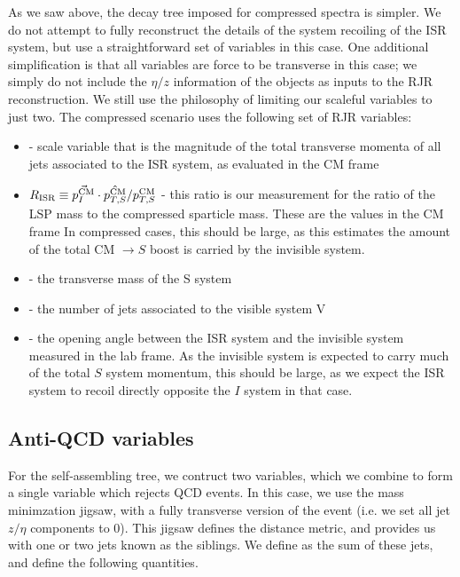 As we saw above, the decay tree imposed for compressed spectra is simpler.
We do not attempt to fully reconstruct the details of the system recoiling of the ISR system, but use a straightforward set of variables in this case.
One additional simplification is that all variables are force to be transverse in this case; we simply do not include the $\eta/z$ information of the objects as inputs to the RJR reconstruction.
We still use the philosophy of limiting our scaleful variables to just two.
The compressed scenario uses the following set of RJR variables:
\begin{itemize}
\item \ptisr - scale variable that is the magnitude of the total transverse momenta of all jets associated to the ISR system, as evaluated in the CM frame
\item $R_{\text{ISR}} \equiv \vec{p_I^{\text{CM}}} \cdot \hat{p_{T,S}^{\text{CM}}} / p_{T,S}^{\text{CM}} $  - this ratio is our measurement for the ratio of the LSP mass to the compressed sparticle mass.  These are the values in the CM frame  In compressed cases, this should be large, as this estimates the amount of the total CM $\rightarrow S$ boost is carried by the invisible system.
\item \MTS - the transverse mass of the S system
\item \NVjet - the number of jets associated to the visible system V
\item \dphiISR - the opening angle between the ISR system and the invisible system measured in the lab frame.  As the invisible system is expected to carry much of the total $S$ system momentum, this should be large, as we expect the ISR system to recoil directly opposite the $I$ system in that case.
\end{itemize}

\subsection{Anti-QCD variables}

For the self-assembling tree, we contruct two variables, which we combine to form a single variable which rejects QCD events.
In this case, we use the mass minimzation jigsaw, with a fully transverse version of the event (i.e. we set all jet $z/\eta$ components to 0).
This jigsaw defines the distance metric, and provides us with one or two jets known as the \met siblings.
We define \psib as the sum of these jets, and define the following quantities.

